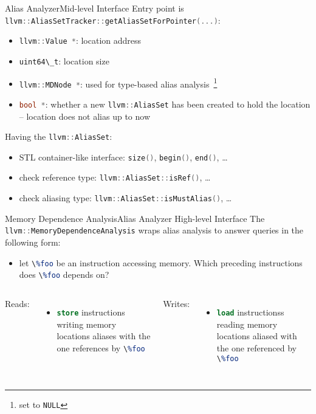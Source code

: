 \documentclass[10pt,mathserif]{beamer}
\newcommand{\cppinline}[1]{\lstinline[language=C++]!#1!}
\newcommand{\llvminline}[1]{\lstinline[language=LLVM]!#1!}
\begin{document}
\begin{frame}{Alias Analyzer}{Mid-level Interface}
Entry point is \cppinline{llvm::AliasSetTracker::getAliasSetForPointer(...)}:

\begin{itemize}
\item \cppinline{llvm::Value *}: location address
\item \cppinline{uint64\_t}: location size
\item \cppinline{llvm::MDNode *}: used for type-based alias
      analysis~\footnote{set to \cppinline{NULL}}
\item \cppinline{bool *}: whether a new \cppinline{llvm::AliasSet} has been
      created to hold the location -- location does not alias up to now
\end{itemize}

\vfill
Having the \cppinline{llvm::AliasSet}:

\begin{itemize}
\item STL container-like interface: \cppinline{size()}, \cppinline{begin()},
      \cppinline{end()}, \ldots
\item check reference type: \cppinline{llvm::AliasSet::isRef()}, \ldots
\item check aliasing type: \cppinline{llvm::AliasSet::isMustAlias()}, \ldots
\end{itemize}
\end{frame}

\begin{frame}{Memory Dependence Analysis}{Alias Analyzer High-level Interface}
The \cppinline{llvm::MemoryDependenceAnalysis} wraps alias analysis to answer
queries in the following form:

\begin{itemize}
\item let \llvminline{\%foo} be an instruction accessing memory. Which
      preceding instructions does \llvminline{\%foo} depends on?
\end{itemize}

\vfill
\begin{columns}[t]
Reads:

\begin{itemize}
\item \llvminline{store} instructions writing memory locations aliases with
      the one references by \llvminline{\%foo}
\end{itemize}

Writes:

\begin{itemize}
\item \llvminline{load} instructionss reading memory locations aliased with
      the one referenced by \llvminline{\%foo}
\end{itemize}
\end{columns}
\end{frame}
\end{document}
